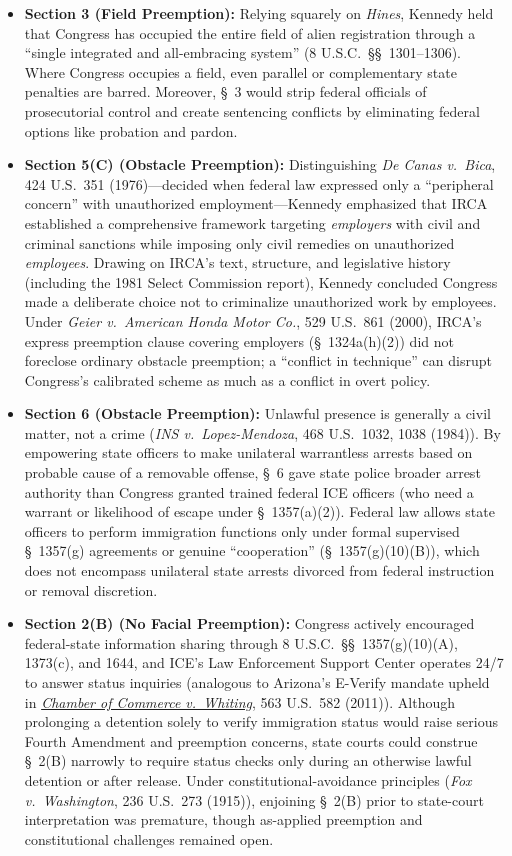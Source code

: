 \documentclass[12pt]{article}
\begin{document}
\begin{itemize}
\item \textbf{Section 3 (Field Preemption):} Relying squarely on \textit{Hines}, Kennedy held that Congress has occupied the entire field of alien registration through a ``single integrated and all-embracing system'' (8 U.S.C.\ \S\S~1301--1306). Where Congress occupies a field, even parallel or complementary state penalties are barred. Moreover, \S~3 would strip federal officials of prosecutorial control and create sentencing conflicts by eliminating federal options like probation and pardon.
\item \textbf{Section 5(C) (Obstacle Preemption):} Distinguishing \textit{De Canas v.\ Bica}, 424 U.S.\ 351 (1976)---decided when federal law expressed only a ``peripheral concern'' with unauthorized employment---Kennedy emphasized that IRCA established a comprehensive framework targeting \textit{employers} with civil and criminal sanctions while imposing only civil remedies on unauthorized \textit{employees}. Drawing on IRCA's text, structure, and legislative history (including the 1981 Select Commission report), Kennedy concluded Congress made a deliberate choice not to criminalize unauthorized work by employees. Under \textit{Geier v.\ American Honda Motor Co.}, 529 U.S.\ 861 (2000), IRCA's express preemption clause covering employers (\S~1324a(h)(2)) did not foreclose ordinary obstacle preemption; a ``conflict in technique'' can disrupt Congress's calibrated scheme as much as a conflict in overt policy.
\item \textbf{Section 6 (Obstacle Preemption):} Unlawful presence is generally a civil matter, not a crime (\textit{INS v.\ Lopez-Mendoza}, 468 U.S.\ 1032, 1038 (1984)). By empowering state officers to make unilateral warrantless arrests based on probable cause of a removable offense, \S~6 gave state police broader arrest authority than Congress granted trained federal ICE officers (who need a warrant or likelihood of escape under \S~1357(a)(2)). Federal law allows state officers to perform immigration functions only under formal supervised \S~1357(g) agreements or genuine ``cooperation'' (\S~1357(g)(10)(B)), which does not encompass unilateral state arrests divorced from federal instruction or removal discretion.
\item \textbf{Section 2(B) (No Facial Preemption):} Congress actively encouraged federal-state information sharing through 8 U.S.C.\ \S\S~1357(g)(10)(A), 1373(c), and 1644, and ICE's Law Enforcement Support Center operates 24/7 to answer status inquiries (analogous to Arizona's E-Verify mandate upheld in \href{https://supreme.justia.com/cases/federal/us/563/582/}{\textit{Chamber of Commerce v.\ Whiting}}, 563 U.S.\ 582 (2011)). Although prolonging a detention solely to verify immigration status would raise serious Fourth Amendment and preemption concerns, state courts could construe \S~2(B) narrowly to require status checks only during an otherwise lawful detention or after release. Under constitutional-avoidance principles (\textit{Fox v.\ Washington}, 236 U.S.\ 273 (1915)), enjoining \S~2(B) prior to state-court interpretation was premature, though as-applied preemption and constitutional challenges remained open.
\end{itemize}
\end{document}
